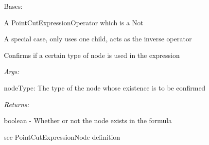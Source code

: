 \documentclass[letterpaper,10pt,english]{sphinxmanual}
\begin{document}
\begin{fulllineitems}
\label{modules/index:aosb.core.PointCutExpressionNot}
Bases: {\hyperref[modules/index:aosb.core.PointCutExpressionOperator]{}}

A PointCutExpressionOperator which is a Not

A special case, only uses one child, acts as the inverse operator

\begin{fulllineitems}
\label{modules/index:aosb.core.PointCutExpressionNot.expressionUses}
Confirms if a certain type of node is used in the expression

\begin{DUlineblock}{0em}
\item[] \emph{Args:}
\item[]
\begin{DUlineblock}{\DUlineblockindent}
\item[] nodeType: The type of the node whose existence is to be confirmed
\end{DUlineblock}
\end{DUlineblock}

\begin{DUlineblock}{0em}
\item[] \emph{Returns:}
\item[]
\begin{DUlineblock}{\DUlineblockindent}
\item[] boolean - Whether or not the node exists in the formula
\end{DUlineblock}
\end{DUlineblock}

\end{fulllineitems}


\begin{fulllineitems}
\label{modules/index:aosb.core.PointCutExpressionNot.match}
see PointCutExpressionNode definition

\end{fulllineitems}



\end{fulllineitems}
\end{document}
